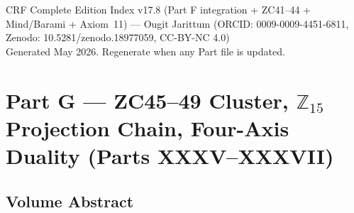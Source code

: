 \documentclass[11pt, a4paper]{article}
\begin{document}
\vfill
\begin{center}
\small\color{mutedgray}
CRF Complete Edition Index v17.8 (Part F integration + ZC41--44 + Mind/Barami + Axiom~11) ---
Ougit Jarittum (ORCID: 0009-0009-4451-6811, Zenodo: 10.5281/zenodo.18977059, CC-BY-NC 4.0)\\
Generated May 2026. Regenerate when any Part file is updated.
\end{center}

\newpage

\section{Part G --- ZC45--49 Cluster, $\mathbb{Z}_{15}$ Projection
  Chain, Four-Axis Duality (Parts XXXV--XXXVII)}

\subsection*{Volume Abstract}
\end{document}
